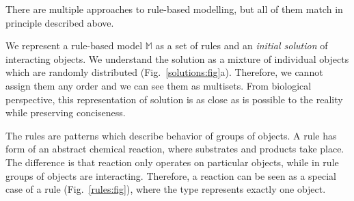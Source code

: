 \documentclass[12pt]{fithesis2}
\begin{document}
There are multiple approaches to rule-based modelling, but all of them match in principle described above.

We represent a rule-based model $\mathds{M}$ as a set of rules and an \emph{initial solution} of interacting objects. We understand the solution as a mixture of individual objects which are randomly distributed (Fig.~\ref{solutions:fig}a). Therefore, we cannot assign them any order and we can see them as multisets. From biological perspective, this representation of solution is as close as is possible to the reality while preserving conciseness.

The rules are patterns which describe behavior of groups of objects. A rule has form of an abstract chemical reaction, where substrates and products take place. The difference is that reaction only operates on particular objects, while in rule groups of objects are interacting. Therefore, a reaction can be seen as a special case of a rule (Fig.~\ref{rules:fig}), where the type represents exactly one object.
\end{document}
